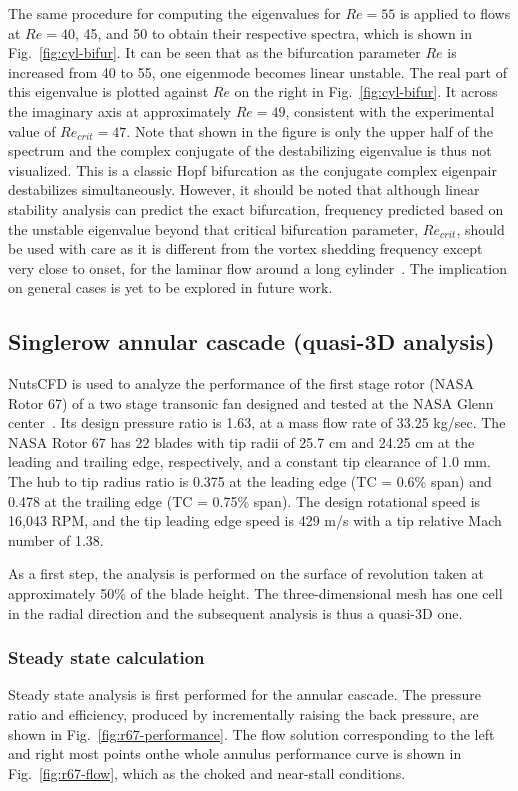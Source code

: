 \documentclass[journal,final]{new-aiaa}
\begin{document}
The same procedure for computing the eigenvalues for $Re=55$ is applied to flows at $Re=40$, 45, and 50
to obtain their respective spectra, which is shown in Fig.~\ref{fig:cyl-bifur}. It can be seen that as the
bifurcation parameter $Re$ is increased from 40 to 55, one eigenmode becomes linear unstable. The
real part of this eigenvalue is plotted against $Re$ on the right in Fig.~\ref{fig:cyl-bifur}. It across the
imaginary axis at approximately $Re=49$, consistent with the experimental value of $Re_{crit}=47$.
Note that shown in the figure is only the upper half of the spectrum and the complex conjugate of
the destabilizing eigenvalue is thus not visualized. This is a classic Hopf bifurcation as the conjugate
complex eigenpair destabilizes simultaneously. However, it should be noted
that although linear stability analysis can predict the exact bifurcation, frequency predicted
based on the unstable eigenvalue beyond that
critical bifurcation parameter, $Re_{crit}$, should be used with care as it is different
from the vortex shedding frequency except very close to onset, for the laminar flow
around a long cylinder~\cite{barkley2006linear}. The implication on general cases
is yet to be explored in future work.

\subsection{Singlerow annular cascade (quasi-3D analysis)}
NutsCFD is used to analyze the performance of the first
stage rotor (NASA Rotor 67) of a two stage transonic fan
designed and tested at the NASA Glenn center~\cite{strazisar1989laser}.
Its design pressure ratio is
1.63, at a mass flow rate of 33.25 kg/sec. 
The NASA Rotor 67 has 22 blades with tip radii of 25.7 cm
and 24.25 cm at the leading and trailing edge, respectively,
and a constant tip clearance of 1.0 mm. The hub to tip radius
ratio is 0.375 at the leading edge (TC = 0.6\% span) and 0.478
at the trailing edge (TC = 0.75\% span). The design rotational
speed is 16,043 RPM, and the tip leading edge speed is 429 m/s
with a tip relative Mach number of 1.38.

As a first step, the analysis is performed on the surface of
revolution taken at approximately 50\% of the blade height.
The three-dimensional mesh has one cell in the radial direction
and the subsequent analysis is thus a quasi-3D one.

\subsubsection{Steady state calculation}
Steady state analysis is first performed for the
annular cascade.
The pressure ratio and efficiency,
produced by incrementally raising the back pressure,
 are shown in Fig.~\ref{fig:r67-performance}.
The flow solution corresponding to the left and right most points
onthe whole annulus performance curve is shown in Fig.~\ref{fig:r67-flow},
which as the choked and near-stall conditions.
\end{document}
